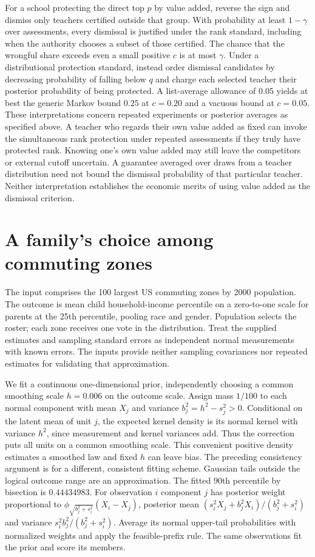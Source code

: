 \documentclass[11pt]{article}
\begin{document}
For a school protecting the direct top $p$ by value added, reverse the sign and dismiss only teachers certified outside that group. With probability at least $1-\gamma$ over assessments, every dismissal is justified under the rank standard, including when the authority chooses a subset of those certified. The chance that the wrongful share exceeds even a small positive $c$ is at most $\gamma$. Under a distributional protection standard, instead order dismissal candidates by decreasing probability of falling below $q$ and charge each selected teacher their posterior probability of being protected. A list-average allowance of $0.05$ yields at best the generic Markov bound $0.25$ at $c=0.20$ and a vacuous bound at $c=0.05$. These interpretations concern repeated experiments or posterior averages as specified above. A teacher who regards their own value added as fixed can invoke the simultaneous rank protection under repeated assessments if they truly have protected rank. Knowing one's own value added may still leave the competitors or external cutoff uncertain. A guarantee averaged over draws from a teacher distribution need not bound the dismissal probability of that particular teacher. Neither interpretation establishes the economic merits of using value added as the dismissal criterion.

\section{A family's choice among commuting zones}
The input comprises the 100 largest US commuting zones by 2000 population. The outcome is mean child household-income percentile on a zero-to-one scale for parents at the 25th percentile, pooling race and gender. Population selects the roster; each zone receives one vote in the distribution. Treat the supplied estimates and sampling standard errors as independent normal measurements with known errors. The inputs provide neither sampling covariances nor repeated estimates for validating that approximation.

We fit a continuous one-dimensional prior, independently choosing a common smoothing scale $h=0.006$ on the outcome scale. Assign mass $1/100$ to each normal component with mean $X_j$ and variance $b_j^2=h^2-s_j^2>0$. Conditional on the latent mean of unit $j$, the expected kernel density is its normal kernel with variance $h^2$, since measurement and kernel variances add. Thus the correction puts all units on a common smoothing scale. This convenient positive density estimates a smoothed law and fixed $h$ can leave bias. The preceding consistency argument is for a different, consistent fitting scheme. Gaussian tails outside the logical outcome range are an approximation. The fitted 90th percentile by bisection is $0.44434983$. For observation $i$ component $j$ has posterior weight proportional to $\phi_{\sqrt{b_j^2+s_i^2}}(X_i-X_j)$, posterior mean $(s_i^2 X_j+b_j^2 X_i)/(b_j^2+s_i^2)$ and variance $s_i^2 b_j^2/(b_j^2+s_i^2)$. Average its normal upper-tail probabilities with normalized weights and apply the feasible-prefix rule. The same observations fit the prior and score its members.
\end{document}
